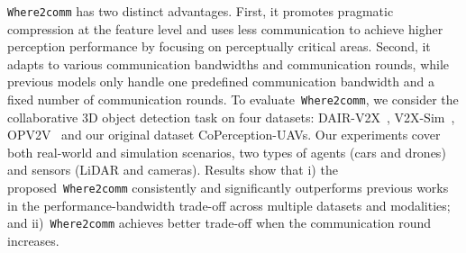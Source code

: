 \texttt{Where2comm} has two distinct advantages. First, it promotes pragmatic compression at the feature level and uses less communication to achieve higher perception performance by focusing on perceptually critical areas. Second, it adapts to various communication bandwidths and communication rounds, while previous models only handle one predefined communication bandwidth and a fixed number of communication rounds. To evaluate~\texttt{Where2comm}, we consider the collaborative 3D object detection task on four datasets: DAIR-V2X~\cite{dair}, V2X-Sim~\cite{V2XSim}, OPV2V~\cite{OPV2V} and our original dataset CoPerception-UAVs. Our experiments cover both real-world and simulation scenarios, two types of agents (cars and drones) and sensors (LiDAR and cameras). Results show that i) the proposed~\texttt{Where2comm} consistently and significantly outperforms previous works in the performance-bandwidth trade-off across multiple datasets and modalities; and ii)~\texttt{Where2comm} achieves better trade-off when the communication round increases.
